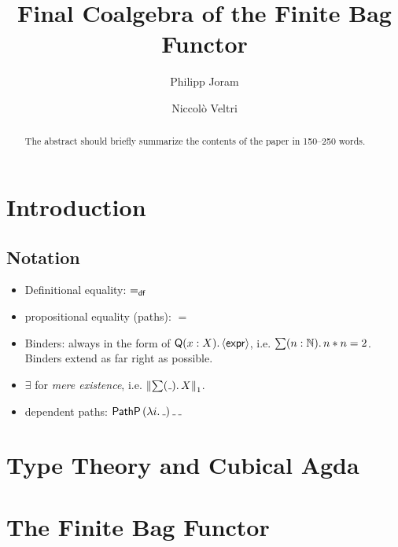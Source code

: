 \documentclass[runningheads]{llncs}
\begin{document}
\title{Final Coalgebra of the Finite Bag Functor}
\author{%
    Philipp Joram \and
    Niccolò Veltri%
}
%

\maketitle              %

\begin{abstract}
The abstract should briefly summarize the contents of the paper in
150--250 words.

\end{abstract}

\section{Introduction}

\subsection{Notation}
\begin{itemize}
  \item Definitional equality: $\mathbin{=_\mathsf{df}}$
  \item propositional equality (paths): $=$
  \item Binders: always in the form of $\mathsf{Q} (x : X)\mathpunct{.} \langle\mathsf{expr}\rangle$,
    i.e. $\sum (n : \mathbb{N})\mathpunct{.} n * n = 2$.
    Binders extend as far right as possible.
  \item $\exists$ for \emph{mere existence}, i.e. $\PropTrunc{\sum (\mathunderscore)\Where X}$.
  \item dependent paths: $\PathP{} (\lambda i\Where \mathunderscore)\, \mathunderscore\, \mathunderscore$
\end{itemize}

\section{Type Theory and Cubical Agda}

\section{The Finite Bag Functor}
\end{document}
